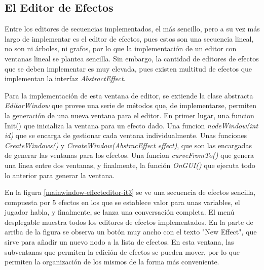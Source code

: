 \subsection{El Editor de Efectos}

Entre los editores de secuencias implementados, el más sencillo, pero a su vez más largo de implementar es el editor de efectos, pues estos son una secuencia lineal, no son ni árboles, ni grafos, por lo que la implementación de un editor con ventanas lineal se plantea sencilla. Sin embargo, la cantidad de editores de efectos que se deben implementar es muy elevada, pues existen multitud de efectos que implementan la interfaz \textit{AbstractEffect}.

Para la implementación de esta ventana de editor, se extiende la clase abstracta \textit{EditorWindow} que provee una serie de métodos que, de implementarse, permiten la generación de una nueva ventana para el editor. En primer lugar, una funcion Init() que inicializa la ventana para un efecto dado. Una funcion \textit{nodeWindow(int id)} que se encarga de gestionar cada ventana individualmente. Unas funciones \textit{CreateWindows()} y \textit{CreateWindow(AbstracEffect effect)}, que son las encargadas de generar las ventanas para los efectos. Una funcion \textit{curveFromTo()} que genera una línea entre dos ventanas, y finalmente, la función \textit{OnGUI()} que ejecuta todo lo anterior para generar la ventana.

En la figura \ref{mainwindow-effecteditor-it3} se ve una secuencia de efectos sencilla, compuesta por 5 efectos en los que se establece valor para unas variables, el jugador habla, y finalmente, se lanza una conversación completa. El menú desplegable muestra todos los editores de efectos implementados. En la parte de arriba de la figura se observa un botón muy ancho con el texto "New Effect", que sirve para añadir un nuevo nodo a la lista de efectos. En esta ventana, las subventanas que permiten la edición de efectos se pueden mover, por lo que permiten la organización de los mismos de la forma más conveniente.

